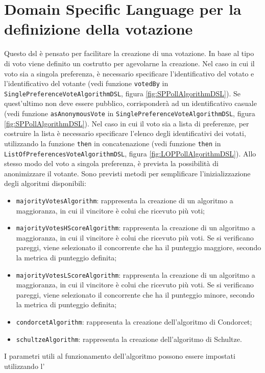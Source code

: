 \documentclass[12pt,a4paper,openright,twoside]{book}
\begin{document}
 \section{Domain Specific Language per la definizione della votazione}
 Questo \ac{dsl} è pensato per facilitare la creazione di una votazione.
 In base al tipo di voto viene definito un costrutto per agevolarne la creazione.
 Nel caso in cui il voto sia a singola preferenza, è necessario specificare
 l'identificativo del votato e l'identificativo del votante (vedi funzione \texttt{votedBy} in \texttt{SinglePreferenceVoteAlgorithmDSL}, figura \ref{fig:SPPollAlgorithmDSL}). Se quest'ultimo non 
 deve essere pubblico, corrisponderà ad un identificativo casuale (vedi funzione \texttt{asAnonymousVote} in \texttt{SinglePreferenceVoteAlgorithmDSL}, figura \ref{fig:SPPollAlgorithmDSL}).
 Nel caso in cui il voto sia a lista di preferenze, per costruire la lista è necessario specificare l'elenco degli identificativi dei votati,
 utilizzando la funzione \texttt{then} in concatenazione (vedi funzione \texttt{then} in \texttt{ListOfPreferencesVoteAlgorithmDSL}, figura \ref{fig:LOPPollAlgorithmDSL}).
 Allo stesso modo del voto a singola preferenza, è prevista la possibilità di anonimizzare il votante.
 Sono previsti metodi per semplificare l'inizializzazione degli algoritmi disponibili:
 \begin{itemize}
    \item{\texttt{majorityVotesAlgorithm}: rappresenta la creazione di un algoritmo a maggioranza, in cui il vincitore è colui che ricevuto più voti;}
    \item{\texttt{majorityVotesHScoreAlgorithm}: rappresenta la creazione di un algoritmo a maggioranza, in cui il vincitore è colui che ricevuto più voti.
    Se si verificano pareggi, viene selezionato il concorrente che ha il punteggio maggiore, secondo la metrica di punteggio definita;}
    \item{\texttt{majorityVotesLScoreAlgorithm}: rappresenta la creazione di un algoritmo a maggioranza, in cui il vincitore è colui che ricevuto più voti.
    Se si verificano pareggi, viene selezionato il concorrente che ha il punteggio minore, secondo la metrica di punteggio definita;}
    \item{\texttt{condorcetAlgorithm}: rappresenta la creazione dell'algoritmo di Condorcet;}
    \item{\texttt{schultzeAlgorithm}: rappresenta la creazione dell'algoritmo di Schultze.}
 \end{itemize}
I parametri utili al funzionamento dell'algoritmo possono essere impostati utilizzando l'
\end{document}
